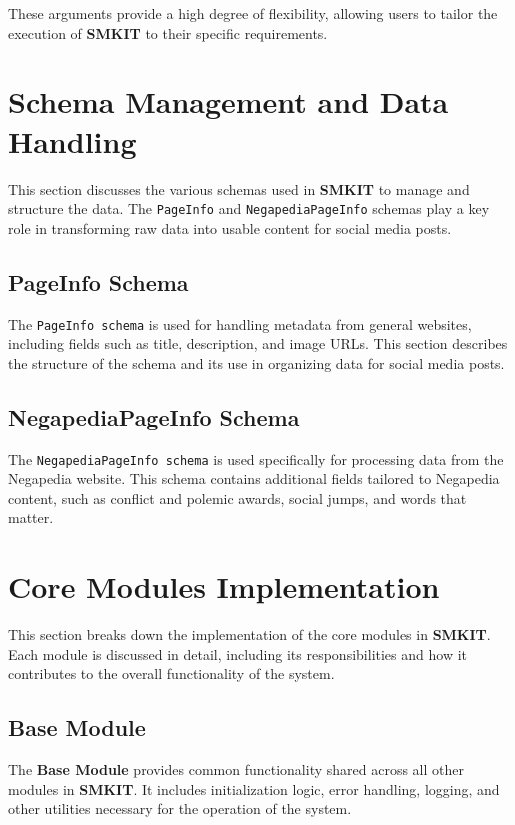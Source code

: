 These arguments provide a high degree of flexibility, allowing users to tailor the execution of \textbf{SMKIT} to their specific requirements.

\section{Schema Management and Data Handling}
\label{sec:schema_management_and_data_handling}
This section discusses the various schemas used in \textbf{SMKIT} to manage and structure the data. The \texttt{PageInfo} and \texttt{NegapediaPageInfo} schemas play a key role in transforming raw data into usable content for social media posts.

\subsection{PageInfo Schema}
\label{subsec:pageinfo_schema}
The \texttt{PageInfo schema} is used for handling metadata from general websites, including fields such as title, description, and image URLs. This section describes the structure of the schema and its use in organizing data for social media posts.

\subsection{NegapediaPageInfo Schema}
\label{subsec:negapediapageinfo_schema}
The \texttt{NegapediaPageInfo schema} is used specifically for processing data from the Negapedia website. This schema contains additional fields tailored to Negapedia content, such as conflict and polemic awards, social jumps, and words that matter.

\section{Core Modules Implementation}
\label{sec:core_modules_implementation}
This section breaks down the implementation of the core modules in \textbf{SMKIT}. Each module is discussed in detail, including its responsibilities and how it contributes to the overall functionality of the system.

\subsection{Base Module}
\label{subsec:base_module}
The \textbf{Base Module} provides common functionality shared across all other modules in \textbf{SMKIT}. It includes initialization logic, error handling, logging, and other utilities necessary for the operation of the system.

